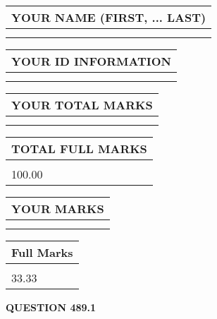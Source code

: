 \documentclass{ctexart}
\begin{document}
   
   
   
\newpage 
\setcounter{page}{ 
   489001 } 
   
   
   
   
\noindent\begin{tabular}{|l|}
\hline
YOUR NAME (FIRST, ... LAST)  \\
\hline
 \\ 
 \\ 
\hline
\end{tabular}
\hspace{0.05in} \begin{tabular}{|l|}
\hline
 YOUR   ID   INFORMATION  \\
\hline
 \\ 
 \\ 
\hline
\end{tabular}
   
   
\vspace{0.2in}\noindent\begin{tabular}{|l|}
\hline
YOUR TOTAL MARKS  \\
\hline
 \\ 
 \\ 
\hline
\end{tabular}
\hspace{0.05in} \begin{tabular}{|l|}
\hline
TOTAL FULL MARKS  \\
\hline
 \\ 
100.00 \\
\hline
\end{tabular}
   
   
 \vspace{0.2in}
 
 
 
 
   
   
  
\vspace{0.2in}
  
\noindent\begin{tabular}{|l|}
\hline
 YOUR MARKS  \\
\hline
 \\ 
 \\ 
\hline
\end{tabular}
\hspace{0.05in} \begin{tabular}{|l|}
\hline
 Full Marks  \\
\hline
 \\ 
33.33 \\
\hline
\end{tabular}
{\textbf{\Large{QUESTION
489.1 
}}}
  
\end{document}
